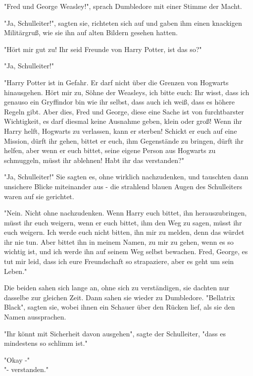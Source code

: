 {"Fred und George Weasley!", sprach Dumbledore mit einer Stimme der Macht.

"Ja, Schulleiter!", sagten sie, richteten sich auf und gaben ihm einen knackigen Militärgruß, wie sie ihn auf alten Bildern gesehen hatten.

"Hört mir gut zu! Ihr seid Freunde von Harry Potter, ist das so?"

"Ja, Schulleiter!"

"Harry Potter ist in Gefahr. Er darf nicht über die Grenzen von Hogwarts hinausgehen. Hört mir zu, Söhne der Weasleys, ich bitte euch: Ihr wisst, dass ich genauso ein Gryffindor bin wie ihr selbst, dass auch ich weiß, dass es höhere Regeln gibt. Aber dies, Fred und George, diese eine Sache ist von furchtbarster Wichtigkeit, es darf diesmal keine Ausnahme geben, klein oder groß! Wenn ihr Harry helft, Hogwarts zu verlassen, kann er sterben! Schickt er euch auf eine Mission, dürft ihr gehen, bittet er euch, ihm Gegenstände zu bringen, dürft ihr helfen, aber wenn er euch bittet, seine eigene Person aus Hogwarts zu schmuggeln, müsst ihr ablehnen! Habt ihr das verstanden?"

"Ja, Schulleiter!" Sie sagten es, ohne wirklich nachzudenken, und tauschten dann unsichere Blicke miteinander aus - die strahlend blauen Augen des Schulleiters waren auf sie gerichtet.

"Nein. Nicht ohne nachzudenken. Wenn Harry euch bittet, ihn herauszubringen, müsst ihr euch weigern, wenn er euch bittet, ihm den Weg zu sagen, müsst ihr euch weigern. Ich werde euch nicht bitten, ihn mir zu melden, denn das würdet ihr nie tun. Aber bittet ihn in meinem Namen, zu mir zu gehen, wenn es so wichtig ist, und ich werde ihn auf seinem Weg selbst bewachen. Fred, George, es tut mir leid, dass ich eure Freundschaft so strapaziere, aber es geht um sein Leben."

Die beiden sahen sich lange an, ohne sich zu verständigen, sie dachten nur dasselbe zur gleichen Zeit. Dann sahen sie wieder zu Dumbledore. "Bellatrix Black", sagten sie, wobei ihnen ein Schauer über den Rücken lief, als sie den Namen aussprachen.

"Ihr könnt mit Sicherheit davon ausgehen", sagte der Schulleiter, "dass es mindestens so schlimm ist."

"Okay -"\\ "- verstanden."

}
